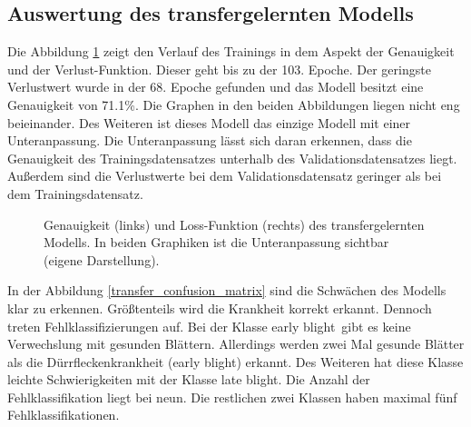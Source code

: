 \subsection{Auswertung des transfergelernten Modells}


Die Abbildung \ref{eval_acc_loss_transfer} zeigt den Verlauf des Trainings in dem Aspekt der Genauigkeit und der Verlust-Funktion. Dieser geht bis zu der 103. Epoche. Der geringste Verlustwert wurde in der 68. Epoche gefunden und das Modell besitzt eine Genauigkeit von 71.1\%. Die Graphen in den beiden Abbildungen liegen nicht eng beieinander. Des Weiteren ist dieses Modell das einzige Modell mit einer Unteranpassung. Die Unteranpassung lässt sich daran erkennen, dass die Genauigkeit des Trainingsdatensatzes unterhalb des Validationsdatensatzes liegt. Außerdem sind die Verlustwerte bei dem Validationsdatensatz geringer als bei dem Trainingsdatensatz.

\begin{figure}[h!]
	\hfill
	\hfill
	\hfill
	\caption{Genauigkeit (links) und Loss-Funktion (rechts) des transfergelernten Modells. In beiden Graphiken ist die Unteranpassung sichtbar (eigene Darstellung).
	}
	\label{eval_acc_loss_transfer}
\end{figure}



In der Abbildung \ref{transfer_confusion_matrix} sind die Schwächen des Modells klar zu erkennen. Größtenteils wird die Krankheit korrekt erkannt. Dennoch treten Fehlklassifizierungen auf. Bei der Klasse \glqq early blight\grqq~gibt es keine Verwechslung mit gesunden Blättern. Allerdings werden zwei Mal gesunde Blätter als die Dürrfleckenkrankheit (early blight) erkannt. Des Weiteren hat diese Klasse leichte Schwierigkeiten mit der Klasse \glqq late blight\grqq. Die Anzahl der Fehlklassifikation liegt bei neun. Die restlichen zwei Klassen haben maximal fünf Fehlklassifikationen.

